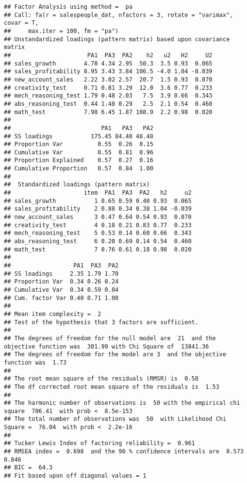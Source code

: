 \documentclass[
]{article}
\begin{document}
\begin{verbatim}
## Factor Analysis using method =  pa
## Call: fa(r = salespeople_dat, nfactors = 3, rotate = "varimax", covar = T, 
##     max.iter = 100, fm = "pa")
## Unstandardized loadings (pattern matrix) based upon covariance matrix
##                      PA1  PA3  PA2    h2   u2   H2     U2
## sales_growth        4.78 4.34 2.95  50.3  3.5 0.93  0.065
## sales_profitability 8.95 3.43 3.84 106.5 -4.0 1.04 -0.039
## new_account_sales   2.22 3.02 2.57  20.7  1.5 0.93  0.070
## creativity_test     0.71 0.81 3.29  12.0  3.6 0.77  0.233
## mech_reasoning_test 1.79 0.48 2.03   7.5  3.9 0.66  0.343
## abs_reasoning_test  0.44 1.48 0.29   2.5  2.1 0.54  0.460
## math_test           7.98 6.45 1.87 108.9  2.2 0.98  0.020
## 
##                          PA1   PA3   PA2
## SS loadings           175.45 84.40 48.48
## Proportion Var          0.55  0.26  0.15
## Cumulative Var          0.55  0.81  0.96
## Proportion Explained    0.57  0.27  0.16
## Cumulative Proportion   0.57  0.84  1.00
## 
##  Standardized loadings (pattern matrix)
##                     item  PA1  PA3  PA2   h2     u2
## sales_growth           1 0.65 0.59 0.40 0.93  0.065
## sales_profitability    2 0.88 0.34 0.38 1.04 -0.039
## new_account_sales      3 0.47 0.64 0.54 0.93  0.070
## creativity_test        4 0.18 0.21 0.83 0.77  0.233
## mech_reasoning_test    5 0.53 0.14 0.60 0.66  0.343
## abs_reasoning_test     6 0.20 0.69 0.14 0.54  0.460
## math_test              7 0.76 0.61 0.18 0.98  0.020
## 
##                  PA1  PA3  PA2
## SS loadings     2.35 1.79 1.70
## Proportion Var  0.34 0.26 0.24
## Cumulative Var  0.34 0.59 0.84
## Cum. factor Var 0.40 0.71 1.00
## 
## Mean item complexity =  2
## Test of the hypothesis that 3 factors are sufficient.
## 
## The degrees of freedom for the null model are  21  and the objective function was  301.99 with Chi Square of  13841.36
## The degrees of freedom for the model are 3  and the objective function was  1.73 
## 
## The root mean square of the residuals (RMSR) is  0.58 
## The df corrected root mean square of the residuals is  1.53 
## 
## The harmonic number of observations is  50 with the empirical chi square  706.41  with prob <  8.5e-153 
## The total number of observations was  50  with Likelihood Chi Square =  76.04  with prob <  2.2e-16 
## 
## Tucker Lewis Index of factoring reliability =  0.961
## RMSEA index =  0.698  and the 90 % confidence intervals are  0.573 0.846
## BIC =  64.3
## Fit based upon off diagonal values = 1
\end{verbatim}
\end{document}
